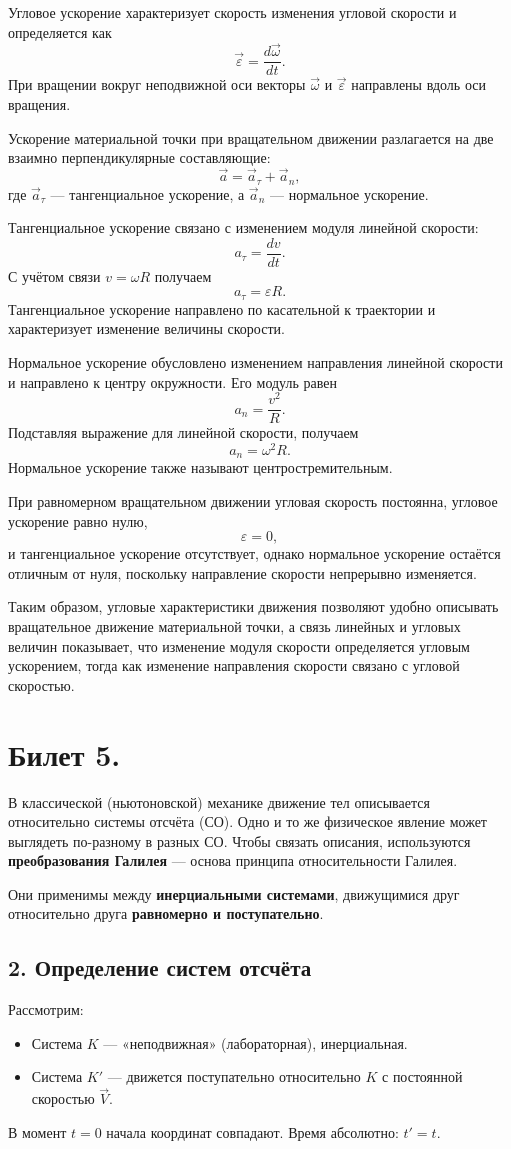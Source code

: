 \documentclass[a4paper,12pt]{article}
\begin{document}
Угловое ускорение характеризует скорость изменения угловой скорости и
определяется как
\[
\vec\varepsilon = \frac{d\vec\omega}{dt}.
\]
При вращении вокруг неподвижной оси векторы \(\vec\omega\) и
\(\vec\varepsilon\) направлены вдоль оси вращения.

Ускорение материальной точки при вращательном движении разлагается на
две взаимно перпендикулярные составляющие:
\[
\vec a = \vec a_\tau + \vec a_n,
\]
где \(\vec a_\tau\) --- тангенциальное ускорение, а \(\vec a_n\) ---
нормальное ускорение.

Тангенциальное ускорение связано с изменением модуля линейной скорости:
\[
a_\tau = \frac{dv}{dt}.
\]
С учётом связи \(v = \omega R\) получаем
\[
a_\tau = \varepsilon R.
\]
Тангенциальное ускорение направлено по касательной к траектории и
характеризует изменение величины скорости.

Нормальное ускорение обусловлено изменением направления линейной
скорости и направлено к центру окружности. Его модуль равен
\[
a_n = \frac{v^2}{R}.
\]
Подставляя выражение для линейной скорости, получаем
\[
a_n = \omega^2 R.
\]
Нормальное ускорение также называют центростремительным.

При равномерном вращательном движении угловая скорость постоянна,
угловое ускорение равно нулю,
\[
\varepsilon = 0,
\]
и тангенциальное ускорение отсутствует, однако нормальное ускорение
остаётся отличным от нуля, поскольку направление скорости непрерывно
изменяется.

Таким образом, угловые характеристики движения позволяют удобно
описывать вращательное движение материальной точки, а связь линейных и
угловых величин показывает, что изменение модуля скорости определяется
угловым ускорением, тогда как изменение направления скорости связано с
угловой скоростью.

\section*{Билет 5.}
В классической (ньютоновской) механике движение тел описывается относительно системы отсчёта (СО). Одно и то же физическое явление может выглядеть по-разному в разных СО. Чтобы связать описания, используются \textbf{преобразования Галилея} — основа принципа относительности Галилея.

Они применимы между \textbf{инерциальными системами}, движущимися друг относительно друга \textbf{равномерно и поступательно}.

\subsection*{2. Определение систем отсчёта}
Рассмотрим:
\begin{itemize}
    \item Система $K$ — «неподвижная» (лабораторная), инерциальная.
    \item Система $K'$ — движется поступательно относительно $K$ с постоянной скоростью $\vec{V}$.
\end{itemize}
В момент $t = 0$ начала координат совпадают. Время абсолютно: $t' = t$.
\end{document}
